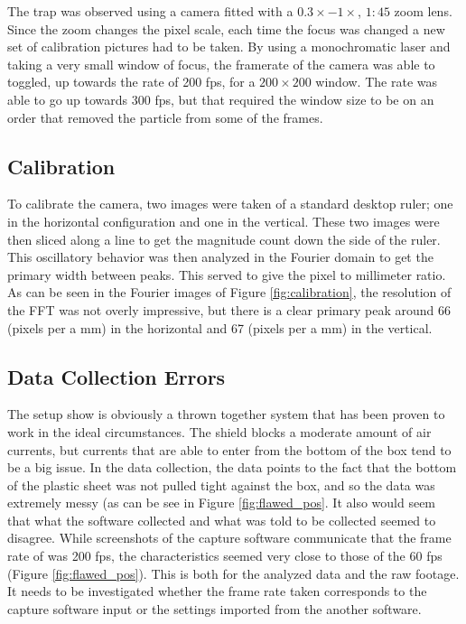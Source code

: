 \documentclass[12pt]{article}
\begin{document}
The trap was observed using a camera fitted with a $0.3\times - 1\times$, $1:45$ zoom lens. Since the zoom changes the pixel scale, each time the focus was changed a new set of calibration pictures had to be taken. By using a monochromatic laser and taking a very small window of focus, the framerate of the camera was able to toggled, up towards the rate of 200 fps, for a $200 \times 200$ window. The rate was able to go up towards 300 fps, but that required the window size to be on an order that removed the particle from some of the frames. 


\subsection{Calibration}
To calibrate the camera, two images were taken of a standard desktop ruler; one in the horizontal configuration and one in the vertical. These two images were then sliced along a line to get the magnitude count down the side of the ruler. This oscillatory behavior was then analyzed in the Fourier domain to get the primary width between peaks. This served to give the pixel to millimeter ratio. As can be seen in the Fourier images of Figure \ref{fig:calibration}, the resolution of the FFT was not overly impressive, but there is a clear primary peak around 66 (pixels per a mm) in the horizontal and 67 (pixels per a mm) in the vertical.


\subsection{Data Collection Errors}
The setup show is obviously a thrown together system that has been proven to work in the ideal circumstances. The shield blocks a moderate amount of air currents, but currents that are able to enter from the bottom of the box tend to be a big issue. In the data collection, the data points to the fact that the bottom of the plastic sheet was not pulled tight against the box, and so the data was extremely messy (as can be see in Figure \ref{fig:flawed_pos}. It also would seem that what the software collected and what was told to be collected seemed to disagree. While screenshots of the capture software communicate that the frame rate of was 200 fps, the characteristics seemed very close to those of the 60 fps (Figure \ref{fig:flawed_pos}). This is both for the analyzed data and the raw footage. It needs to be investigated whether the frame rate taken corresponds to the capture software input or the settings imported from the another software.
\end{document}
